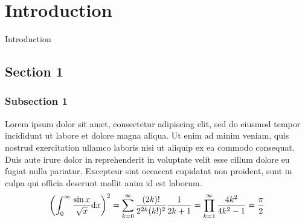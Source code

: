 



\chapter{Introduction}
Introduction

\section{Section 1}
\subsection{Subsection 1}
Lorem ipsum dolor sit amet, consectetur adipiscing elit,
sed do eiusmod tempor incididunt ut labore et dolore magna aliqua.
Ut enim ad minim veniam,
quis nostrud exercitation ullamco laboris nisi ut aliquip ex ea commodo consequat.
Duis aute irure dolor in reprehenderit in voluptate velit esse cillum dolore eu fugiat nulla pariatur.
Excepteur sint occaecat cupidatat non proident,
sunt in culpa qui officia deserunt mollit anim id est laborum\cite{PaperSample1}.
\begin{equation}
\qty( \int_{0}^{\infty} \frac{\sin x}{\sqrt{x}} \dd x )^2
    =
    \sum_{ k = 0 }^{ \infty }
        \frac{ (2k)! }{ 2^{2k} (k!)^2 } \frac{1}{ 2k+1 }
    =
    \prod_{ k = 1 }^{ \infty }
        \frac{ 4k^2 }{ 4k^2 - 1 }
    = \frac{ \pi }{ 2 }
\end{equation}



